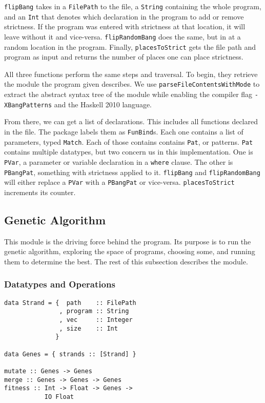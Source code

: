 \documentclass{sigplanconf}
\begin{document}
\lstinline!flipBang! takes in a \lstinline!FilePath! to the file, a \lstinline!String! containing the whole program, and an \lstinline!Int! that denotes which declaration in the program to add or remove strictness. If the program was entered with strictness at that location, it will leave without it and vice-versa. \lstinline!flipRandomBang! does the same, but in at a random location in the program. Finally, \lstinline!placesToStrict! gets the file path and program as input and returns the number of places one can place strictness.

All three functions perform the same steps and traversal. To begin, they retrieve the module the program given describes. We use \lstinline!parseFileContentsWithMode! to extract the abstract syntax tree of the module while enabling the compiler flag \lstinline!-XBangPatterns! and the Haskell 2010 language. 

From there, we can get a list of declarations. This includes all functions declared in the file. The package labels them as \lstinline!FunBind!s. Each one contains a list of parameters, typed \lstinline!Match!. Each of those contains contains \lstinline!Pat!, or patterns. \lstinline!Pat! contains multiple datatypes, but two concern us in this implementation. One is \lstinline!PVar!, a parameter or variable declaration in a \lstinline!where! clause. The other is \lstinline!PBangPat!, something with strictness applied to it. \lstinline!flipBang! and \lstinline!flipRandomBang! will either replace a \lstinline!PVar! with a \lstinline!PBangPat! or vice-versa. \lstinline!placesToStrict! increments its counter.

\subsection{Genetic Algorithm}
This module is the driving force behind the program. Its purpose is to run the genetic algorithm, exploring the space of programs, choosing some, and running them to determine the best. The rest of this subsection describes the module.
\subsubsection{Datatypes and Operations}
\begin{lstlisting}[caption=Datatypes and operations in Genetic module,label={lst:genetic}]
data Strand = {  path    :: FilePath
               , program :: String
               , vec     :: Integer
               , size    :: Int
              }

data Genes = { strands :: [Strand] }

mutate :: Genes -> Genes
merge :: Genes -> Genes -> Genes
fitness :: Int -> Float -> Genes -> 
           IO Float
\end{lstlisting}
\end{document}
